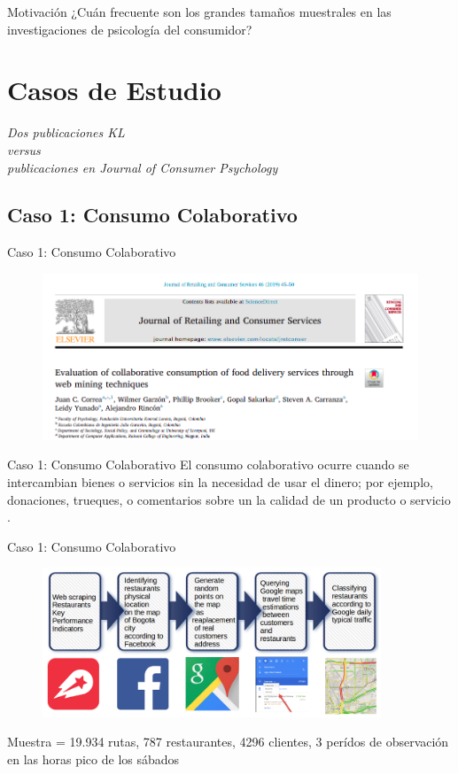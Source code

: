 \documentclass{beamer}
\begin{document}
\begin{frame}{Motivación}
\Large
\centering
¿Cuán frecuente son los grandes tamaños muestrales en las investigaciones de psicología del consumidor?
\end{frame}


\section{Casos de Estudio}
\begin{frame}
    \centering
    \Huge
    \textit{Dos publicaciones KL\\
    versus \\
    publicaciones en Journal of Consumer Psychology}
\end{frame}

\subsection{Caso 1: Consumo Colaborativo}
\begin{frame}{Caso 1: Consumo Colaborativo}
\begin{figure}
\centering
\includegraphics[width=1\textwidth]{Paper2.png}
\end{figure}
\end{frame}

\begin{frame}{Caso 1: Consumo Colaborativo}
El consumo colaborativo ocurre cuando se intercambian bienes o servicios sin la necesidad de usar el dinero; por ejemplo, donaciones, trueques, o comentarios sobre un la calidad de un producto o servicio \cite{Correa2019}. 
\end{frame}

\begin{frame}{Caso 1: Consumo Colaborativo}
\begin{figure}
\centering
\includegraphics[width=0.9\textwidth]{procedure.png}
\end{figure}
Muestra = 19.934 rutas, 787 restaurantes, 4296 clientes, 3 perídos de observación en las horas pico de los sábados \cite{Correa2019}
\end{frame}
\end{document}
